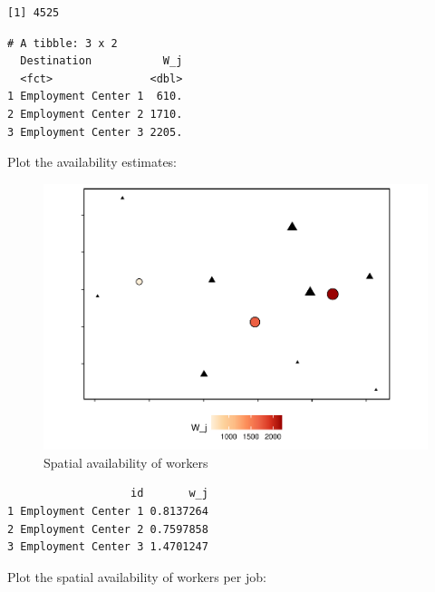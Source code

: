 \documentclass[]{elsarticle} %
\begin{document}
\begin{verbatim}
[1] 4525
\end{verbatim}

\begin{verbatim}
# A tibble: 3 x 2
  Destination           W_j
  <fct>               <dbl>
1 Employment Center 1  610.
2 Employment Center 2 1710.
3 Employment Center 3 2205.
\end{verbatim}

Plot the availability estimates:

\begin{figure}
\includegraphics[width=1\linewidth]{Spatial-Availability_files/figure-latex/toy-example-availability-workers-1} \caption{\label{fig:toy-example-availability-workers}Spatial availability of workers}\label{fig:toy-example-availability-workers}
\end{figure}

\begin{verbatim}
                   id       w_j
1 Employment Center 1 0.8137264
2 Employment Center 2 0.7597858
3 Employment Center 3 1.4701247
\end{verbatim}

Plot the spatial availability of workers per job:
\end{document}

